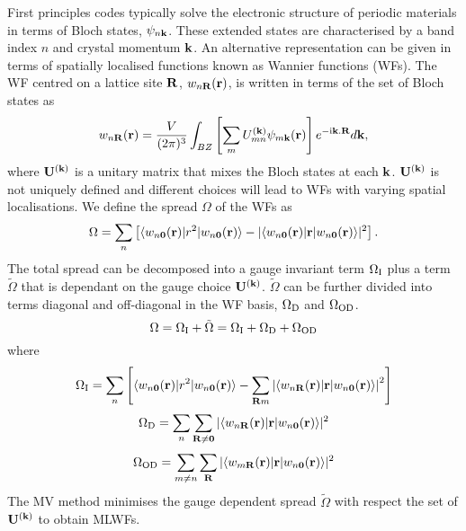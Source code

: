 First principles codes typically solve the electronic structure of
periodic materials in terms of Bloch states, $\psi_{n{\bf k}}$. 
These extended states are characterised by a band index $n$ and crystal
momentum ${\bf k}$. An alternative representation can be given in terms
of spatially localised functions known as Wannier functions (WFs). The WF 
centred on a lattice site ${\bf R}$,  $w_{n{\bf R}}({\bf r})$, 
is written in terms of the set of Bloch states as
\begin{equation}
w_{n{\bf R}}({\bf r})=\frac{V}{(2\pi)^3}\int_{BZ} \left[\sum_{m} U^{({\bf
k})}_{mn} \psi_{m{\bf k}}({\bf r})\right]e^{-\mathrm{i}{\bf k}.{\bf R}} d{\bf k},
\end{equation}
where $\bf{U}^{({\bf k})}$ is a unitary matrix that mixes the Bloch
states at each 
${\bf k}$. $\bf{U}^{({\bf k})}$ is not uniquely defined and different choices
will lead to WFs with varying spatial localisations. We define the
spread $\Omega$
of the WFs as 
\begin{equation}
\Omega=\sum_n \left[\langle w_{n{\bf 0}}({\bf r})| r^2 | w_{n{\bf
      0}}({\bf r}) \rangle - | \langle w_{n{\bf 0}}({\bf r})| {\bf r} | w_{n{\bf
      0}}({\bf r}) \rangle |^2 \right].
\end{equation}
The total spread can be decomposed into a gauge invariant term
$\Omega_{\rm I}$ plus a term ${\tilde \Omega}$ that is dependant on the gauge
choice $\bf{U}^{({\bf k})}$. ${\tilde \Omega}$ can
be further divided into terms diagonal and off-diagonal in the WF basis,
$\Omega_{\rm D}$ and $\Omega_{\rm OD}$.
\begin{equation}
\Omega=\Omega_{\rm I}+{\tilde \Omega}=\Omega_{\rm I}+\Omega_{\rm D}+\Omega_{\rm OD}
\end{equation}
where
\begin{equation}
\Omega_{{\rm I}}=\sum_n \left[\langle w_{n{\bf 0}}({\bf r})| r^2 | w_{n{\bf
      0}}({\bf r}) \rangle - \sum_{{\bf R}m} \left| \langle w_{n{\bf R}}({\bf r})| {\bf r} | w_{n{\bf
      0}}({\bf r}) \rangle \right| ^2 \right]
\end{equation}
\begin{equation}
\Omega_{\rm D}=\sum_n \sum_{{\bf R}\neq{\bf 0}} |\langle w_{n{\bf R}}({\bf r})| {\bf r} |
w_{n{\bf 0}}({\bf r}) \rangle|^2 
\end{equation}
\begin{equation}
\Omega_{\rm OD}=\sum_{m\neq n} \sum_{{\bf R}} |\langle w_{m{\bf R}}({\bf
  r})| {\bf r} |
w_{n{\bf 0}}({\bf r}) \rangle |^2 
\end{equation}
The MV method minimises the gauge dependent spread $\tilde{\Omega}$ with respect the set
of $\bf{U}^{({\bf k})}$ to obtain MLWFs.

